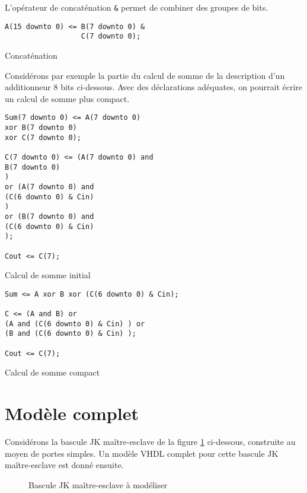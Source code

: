 \documentclass[letter, oneside]{book}
\begin{document}
L'opérateur de concaténation \texttt{\&} permet de combiner des groupes de bits.

\begin{listing}[htbp]
\begin{verbatim}
A(15 downto 0) <= B(7 downto 0) &
                  C(7 downto 0);
\end{verbatim}
\caption{Concaténation}
\end{listing}

Considérons par exemple la partie du calcul de somme de la description
d'un additionneur 8 bits ci-dessous.  Avec des déclarations adéquates,
on pourrait écrire un calcul de somme plus compact.

\begin{listing}[htbp]
\begin{verbatim}
Sum(7 downto 0) <= A(7 downto 0)
xor B(7 downto 0)
xor C(7 downto 0);

C(7 downto 0) <= (A(7 downto 0) and
B(7 downto 0)
)
or (A(7 downto 0) and
(C(6 downto 0) & Cin)
)
or (B(7 downto 0) and
(C(6 downto 0) & Cin)
);

Cout <= C(7);
\end{verbatim}
\caption{Calcul de somme initial}
\end{listing}



\begin{listing}[htbp]
\begin{verbatim}
Sum <= A xor B xor (C(6 downto 0) & Cin);

C <= (A and B) or
(A and (C(6 downto 0) & Cin) ) or
(B and (C(6 downto 0) & Cin) );

Cout <= C(7);
\end{verbatim}
\caption{Calcul de somme compact}
\end{listing}

\section{Modèle complet}
\label{sec:org6216216}

Considérons la bascule JK maître-esclave de la figure \ref{fig:org25e34c7}
ci-dessous, construite au moyen de portes simples.  Un modèle
VHDL complet pour cette bascule JK maître-esclave est donné ensuite.

\begin{figure}[htbp]
\centering

\caption{\label{fig:org25e34c7}Bascule JK maître-esclave à modéliser}
\end{figure}
\end{document}
